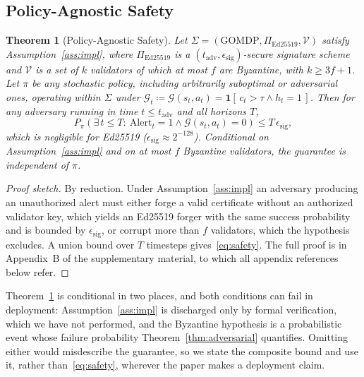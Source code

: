 \documentclass[letterpaper]{article} %
\newtheorem{theorem}{Theorem}
\newcommand{\GOMDP}{\text{GOMDP}}
\newcommand{\calG}{\mathcal{G}}
\newcommand{\appProof}{B}
\begin{document}
\subsection{Policy-Agnostic Safety}
\label{sec:theorem1}

\begin{theorem}[Policy-Agnostic Safety]
\label{thm:safety}
Let $\Sigma=(\GOMDP,\Pi_{\mathrm{Ed25519}},\mathcal{V})$ satisfy Assumption~\ref{ass:impl}, where $\Pi_{\mathrm{Ed25519}}$ is a $(t_{\mathrm{adv}},\epsilon_{\mathrm{sig}})$-secure signature scheme~\citep{bernstein2012ed25519} and $\mathcal{V}$ is a set of $k$ validators of which at most $f$ are Byzantine, with $k\geq 3f+1$. Let $\pi$ be any stochastic policy, including arbitrarily suboptimal or adversarial ones, operating within $\Sigma$ under $\calG_t\coloneqq\calG(s_t,a_t)=\mathbf{1}[\,c_t>\tau \wedge h_t=1\,]$. Then for any adversary running in time $t\leq t_{\mathrm{adv}}$ and all horizons $T$,
\begin{equation}
P_\pi\!\left(\exists\, t \leq T:\ \mathrm{Alert}_t = 1 \wedge \calG(s_t,a_t)=0\right) \leq T\,\epsilon_{\mathrm{sig}},
\label{eq:safety}
\end{equation}
which is negligible for Ed25519 ($\epsilon_{\mathrm{sig}}\approx 2^{-128}$). Conditional on Assumption~\ref{ass:impl} and on at most $f$ Byzantine validators, the guarantee is independent of $\pi$.
\end{theorem}

\begin{proof}[Proof sketch]
By reduction. Under Assumption~\ref{ass:impl} an adversary producing an unauthorized alert must either forge a valid certificate without an authorized validator key, which yields an Ed25519 forger with the same success probability and is bounded by $\epsilon_{\mathrm{sig}}$, or corrupt more than $f$ validators, which the hypothesis excludes. A union bound over $T$ timesteps gives~\eqref{eq:safety}. The full proof is in Appendix~\appProof{} of the supplementary material, to which all appendix references below refer.
\end{proof}

Theorem~\ref{thm:safety} is conditional in two places, and both conditions can fail in deployment: Assumption~\ref{ass:impl} is discharged only by formal verification, which we have not performed, and the Byzantine hypothesis is a probabilistic event whose failure probability Theorem~\ref{thm:adversarial} quantifies. Omitting either would misdescribe the guarantee, so we state the composite bound and use it, rather than~\eqref{eq:safety}, wherever the paper makes a deployment claim.
\end{document}
